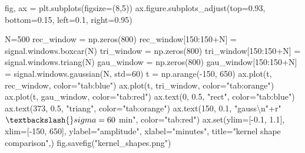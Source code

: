\documentclass[
  letterpaper,
  DIV=11,
  numbers=noendperiod,
  oneside]{scrreprt}
\newenvironment{Shaded}{\begin{snugshade}}{\end{snugshade}}
\newcommand{\BuiltInTok}[1]{\textcolor[rgb]{0.00,0.23,0.31}{#1}}
\newcommand{\CharTok}[1]{\textcolor[rgb]{0.13,0.47,0.30}{#1}}
\newcommand{\DecValTok}[1]{\textcolor[rgb]{0.68,0.00,0.00}{#1}}
\newcommand{\FloatTok}[1]{\textcolor[rgb]{0.68,0.00,0.00}{#1}}
\newcommand{\NormalTok}[1]{\textcolor[rgb]{0.00,0.23,0.31}{#1}}
\newcommand{\OperatorTok}[1]{\textcolor[rgb]{0.37,0.37,0.37}{#1}}
\newcommand{\StringTok}[1]{\textcolor[rgb]{0.13,0.47,0.30}{#1}}
\newcommand{\VerbatimStringTok}[1]{\textcolor[rgb]{0.13,0.47,0.30}{#1}}
\begin{document}
\begin{Shaded}
\begin{Highlighting}[]
\NormalTok{fig, ax }\OperatorTok{=}\NormalTok{ plt.subplots(figsize}\OperatorTok{=}\NormalTok{(}\DecValTok{8}\NormalTok{,}\DecValTok{5}\NormalTok{))}
\NormalTok{ax.figure.subplots\_adjust(top}\OperatorTok{=}\FloatTok{0.93}\NormalTok{, bottom}\OperatorTok{=}\FloatTok{0.15}\NormalTok{, left}\OperatorTok{=}\FloatTok{0.1}\NormalTok{, right}\OperatorTok{=}\FloatTok{0.95}\NormalTok{)}

\NormalTok{N}\OperatorTok{=}\DecValTok{500}
\NormalTok{rec\_window }\OperatorTok{=}\NormalTok{ np.zeros(}\DecValTok{800}\NormalTok{)}
\NormalTok{rec\_window[}\DecValTok{150}\NormalTok{:}\DecValTok{150}\OperatorTok{+}\NormalTok{N] }\OperatorTok{=}\NormalTok{ signal.windows.boxcar(N)}
\NormalTok{tri\_window }\OperatorTok{=}\NormalTok{ np.zeros(}\DecValTok{800}\NormalTok{)}
\NormalTok{tri\_window[}\DecValTok{150}\NormalTok{:}\DecValTok{150}\OperatorTok{+}\NormalTok{N] }\OperatorTok{=}\NormalTok{ signal.windows.triang(N)}
\NormalTok{gau\_window }\OperatorTok{=}\NormalTok{ np.zeros(}\DecValTok{800}\NormalTok{)}
\NormalTok{gau\_window[}\DecValTok{150}\NormalTok{:}\DecValTok{150}\OperatorTok{+}\NormalTok{N] }\OperatorTok{=}\NormalTok{ signal.windows.gaussian(N, std}\OperatorTok{=}\DecValTok{60}\NormalTok{)}
\NormalTok{t }\OperatorTok{=}\NormalTok{ np.arange(}\OperatorTok{{-}}\DecValTok{150}\NormalTok{, }\DecValTok{650}\NormalTok{)}
\NormalTok{ax.plot(t, rec\_window, color}\OperatorTok{=}\StringTok{"tab:blue"}\NormalTok{)}
\NormalTok{ax.plot(t, tri\_window, color}\OperatorTok{=}\StringTok{"tab:orange"}\NormalTok{)}
\NormalTok{ax.plot(t, gau\_window, color}\OperatorTok{=}\StringTok{"tab:red"}\NormalTok{)}
\NormalTok{ax.text(}\DecValTok{0}\NormalTok{, }\FloatTok{0.5}\NormalTok{, }\StringTok{"rect"}\NormalTok{, color}\OperatorTok{=}\StringTok{"tab:blue"}\NormalTok{)}
\NormalTok{ax.text(}\DecValTok{373}\NormalTok{, }\FloatTok{0.5}\NormalTok{, }\StringTok{"triang"}\NormalTok{, color}\OperatorTok{=}\StringTok{"tab:orange"}\NormalTok{)}
\NormalTok{ax.text(}\DecValTok{150}\NormalTok{, }\FloatTok{0.1}\NormalTok{, }\StringTok{"gauss}\CharTok{\textbackslash{}n}\StringTok{"}\OperatorTok{+}\VerbatimStringTok{r"$\textbackslash{}sigma=60$ min"}\NormalTok{, color}\OperatorTok{=}\StringTok{"tab:red"}\NormalTok{)}
\NormalTok{ax.}\BuiltInTok{set}\NormalTok{(ylim}\OperatorTok{=}\NormalTok{[}\OperatorTok{{-}}\FloatTok{0.1}\NormalTok{, }\FloatTok{1.1}\NormalTok{],}
\NormalTok{       xlim}\OperatorTok{=}\NormalTok{[}\OperatorTok{{-}}\DecValTok{150}\NormalTok{, }\DecValTok{650}\NormalTok{],}
\NormalTok{       ylabel}\OperatorTok{=}\StringTok{"amplitude"}\NormalTok{,}
\NormalTok{       xlabel}\OperatorTok{=}\StringTok{"minutes"}\NormalTok{,}
\NormalTok{       title}\OperatorTok{=}\StringTok{"kernel shape comparison"}\NormalTok{,)}
\NormalTok{fig.savefig(}\StringTok{"kernel\_shapes.png"}\NormalTok{)}
\end{Highlighting}
\end{Shaded}
\end{document}
